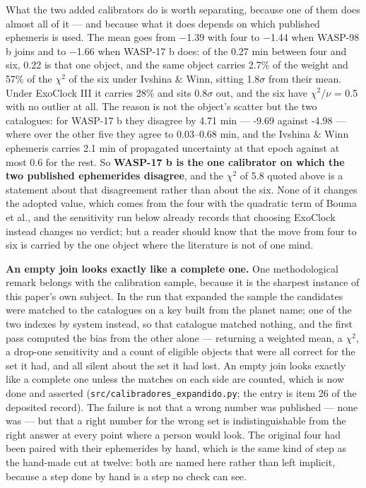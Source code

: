 \documentclass{aa}
\begin{document}
What the two added calibrators do is worth separating, because one of them does almost all of it --- and because what it does depends on which published ephemeris is used. The mean goes from $-$1.39 with four to $-$1.44 when WASP-98 b joins and to $-$1.66 when WASP-17 b does: of the 0.27 min between four and six, 0.22 is that one object, and the same object carries 2.7\% of the weight and 57\% of the $\chi^2$ of the six under Ivshina \& Winn, sitting 1.8$\sigma$ from their mean. Under ExoClock III it carries 28\% and sits 0.8$\sigma$ out, and the six have $\chi^2/\nu$ = 0.5 with no outlier at all. The reason is not the object's scatter but the two catalogues: for WASP-17 b they disagree by 4.71 min --- -9.69 against -4.98 --- where over the other five they agree to 0.03--0.68 min, and the Ivshina \& Winn ephemeris carries 2.1 min of propagated uncertainty at that epoch against at most 0.6 for the rest. So \textbf{WASP-17 b is the one calibrator on which the two published ephemerides disagree}, and the $\chi^2$ of 5.8 quoted above is a statement about that disagreement rather than about the six. None of it changes the adopted value, which comes from the four with the quadratic term of Bouma et al., and the sensitivity run below already records that choosing ExoClock instead changes no verdict; but a reader should know that the move from four to six is carried by the one object where the literature is not of one mind.

\textbf{An empty join looks exactly like a complete one.} One methodological remark belongs with the calibration sample, because it is the sharpest instance of this paper's own subject. In the run that expanded the sample the candidates were matched to the catalogues on a key built from the planet name; one of the two indexes by system instead, so that catalogue matched nothing, and the first pass computed the bias from the other alone --- returning a weighted mean, a $\chi^2$, a drop-one sensitivity and a count of eligible objects that were all correct for the set it had, and all silent about the set it had lost. An empty join looks exactly like a complete one unless the matches on each side are counted, which is now done and asserted (\texttt{src/\allowbreak calibradores\_\allowbreak expandido.py}; the entry is item 26 of the deposited record). The failure is not that a wrong number was published --- none was --- but that a right number for the wrong set is indistinguishable from the right answer at every point where a person would look. The original four had been paired with their ephemerides by hand, which is the same kind of step as the hand-made cut at twelve: both are named here rather than left implicit, because a step done by hand is a step no check can see.
\end{document}

